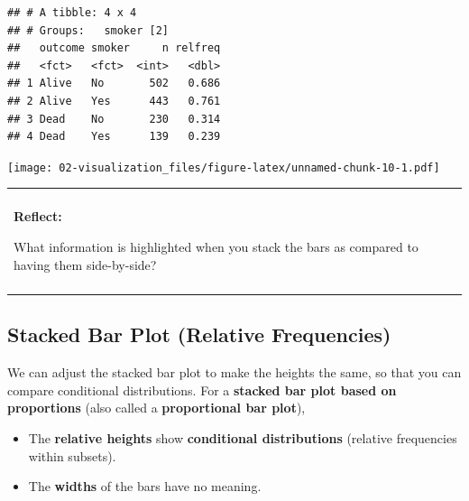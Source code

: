 \documentclass[
]{book}
\newenvironment{Shaded}{\begin{snugshade}}{\end{snugshade}}
\newcommand{\CommentTok}[1]{\textcolor[rgb]{0.56,0.35,0.01}{\textit{#1}}}
\newcommand{\DataTypeTok}[1]{\textcolor[rgb]{0.13,0.29,0.53}{#1}}
\newcommand{\KeywordTok}[1]{\textcolor[rgb]{0.13,0.29,0.53}{\textbf{#1}}}
\newcommand{\NormalTok}[1]{#1}
\newcommand{\OperatorTok}[1]{\textcolor[rgb]{0.81,0.36,0.00}{\textbf{#1}}}
\newcommand{\StringTok}[1]{\textcolor[rgb]{0.31,0.60,0.02}{#1}}
\providecommand{\tightlist}{%
  \setlength{\itemsep}{0pt}\setlength{\parskip}{0pt}}
\newenvironment{reflect}
{
    \begin{center}
    
    \begin{tabular}{|p{0.8\textwidth}|}
    \rowcolor{LightBlue}
    \hline\\
    \rowcolor{LightBlue}
    \textbf{Reflect:}
}
{
    \\\rowcolor{LightBlue}
    \\\hline
    \end{tabular} 
    \end{center}
}
\begin{document}
\begin{verbatim}
## # A tibble: 4 x 4
## # Groups:   smoker [2]
##   outcome smoker     n relfreq
##   <fct>   <fct>  <int>   <dbl>
## 1 Alive   No       502   0.686
## 2 Alive   Yes      443   0.761
## 3 Dead    No       230   0.314
## 4 Dead    Yes      139   0.239
\end{verbatim}

\begin{Shaded}
\end{Shaded}

\texttt{[image: 02-visualization\_files/figure-latex/unnamed-chunk-10-1.pdf]}

\begin{reflect}
What information is highlighted when you stack the bars as compared to
having them side-by-side?
\end{reflect}

\hypertarget{stacked-bar-plot-relative-frequencies}{%
\subsection{Stacked Bar Plot (Relative Frequencies)}\label{stacked-bar-plot-relative-frequencies}}

We can adjust the stacked bar plot to make the heights the same, so that you can compare conditional distributions. For a \textbf{stacked bar plot based on proportions} (also called a \textbf{proportional bar plot}),

\begin{itemize}
\tightlist
\item
  The \textbf{relative heights} show \textbf{conditional distributions} (relative frequencies within subsets).
\item
  The \textbf{widths} of the bars have no meaning.
\end{itemize}
\end{document}
